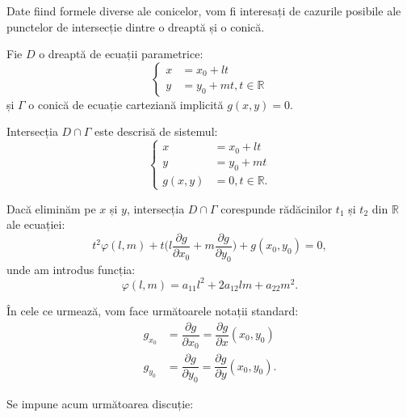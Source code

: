 \documentclass[11pt,a4paper]{article}
\theoremstyle{dotless}
\theoremstyle{dotlessdr}
\begin{document}
\indent\indent Date fiind formele diverse ale conicelor, vom fi interesați de
cazurile posibile ale punctelor de intersecție dintre o dreaptă și o conică.

Fie $D$ o dreaptă de ecuații parametrice: 
 \[
	\begin{cases}	
	    x &= x_0 + lt \\
	    y &= y_0 + mt, t \in \mathbb{R}
    \end{cases}
\]
și $\Gamma$ o conică de ecuație carteziană implicită $g(x, y) = 0$.

Intersecția $D \cap \Gamma$ este descrisă de sistemul: 
 \[
	\begin{cases}	
	    x &= x_0 + lt \\
	    y &= y_0 + mt \\
	    g(x,y) &= 0, t \in \mathbb{R}.
    \end{cases}
\]

Dacă eliminăm pe $x$ și $y$, intersecția $D \cap \Gamma$ corespunde rădăcinilor
$t_1$ și $t_2$ din $\mathbb{R}$ ale ecuației:
\begin{equation}
    \label{equation:conica-dreapta}
	t^2 \varphi(l, m) + t \Big( l \dfrac{\partial g}{\partial x_0} +
	m \dfrac{\partial g}{\partial y_0} \Big) + g(x_0, y_0) = 0,
\end{equation}
unde am introdus funcția: \[
    \varphi(l, m) = a_{11} l^2 + 2a_{12} lm + a_{22} m^2.
\]

În cele ce urmează, vom face următoarele notații standard:
\begin{align*}
	g_{x_0} &= \dfrac{\partial g}{\partial x_0} = 
            	\dfrac{\partial g}{\partial x}(x_0, y_0) \\
    g_{y_0} &= \dfrac{\partial g}{\partial y_0} = 
                \dfrac{\partial g}{\partial y}(x_0, y_0).
\end{align*}

Se impune acum următoarea discuție:
\end{document}
